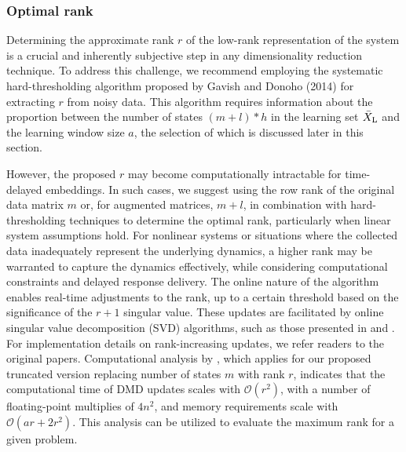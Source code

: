 \subsubsection{Optimal rank}
Determining the approximate rank \( r \) of the low-rank representation of the system is a crucial and inherently subjective step in any dimensionality reduction technique. To address this challenge, we recommend employing the systematic hard-thresholding algorithm proposed by Gavish and Donoho (2014) for extracting \( r \) from noisy data. This algorithm requires information about the proportion between the number of states \((m + l) * h\) in the learning set \(\bar{X} _{\text{L}}\) and the learning window size \(a\), the selection of which is discussed later in this section.

However, the proposed \( r \) may become computationally intractable for time-delayed embeddings. In such cases, we suggest using the row rank of the original data matrix \( m \) or, for augmented matrices, \( m + l \), in combination with hard-thresholding techniques to determine the optimal rank, particularly when linear system assumptions hold. For nonlinear systems or situations where the collected data inadequately represent the underlying dynamics, a higher rank may be warranted to capture the dynamics effectively, while considering computational constraints and delayed response delivery. The online nature of the algorithm enables real-time adjustments to the rank, up to a certain threshold based on the significance of the \(r + 1\) singular value. These updates are facilitated by online singular value decomposition (SVD) algorithms, such as those presented in \citet{Brand2006} and \citet{Zhang2022}. For implementation details on rank-increasing updates, we refer readers to the original papers. Computational analysis by \citet{Zhang2019}, which applies for our proposed truncated version replacing number of states \(m\) with rank \(r\), indicates that the computational time of DMD updates scales with \( \mathcal{O}(r^2) \), with a number of floating-point multiplies of \(4n^2\), and memory requirements scale with \( \mathcal{O}(a r + 2 r ^ 2) \). This analysis can be utilized to evaluate the maximum rank for a given problem.

